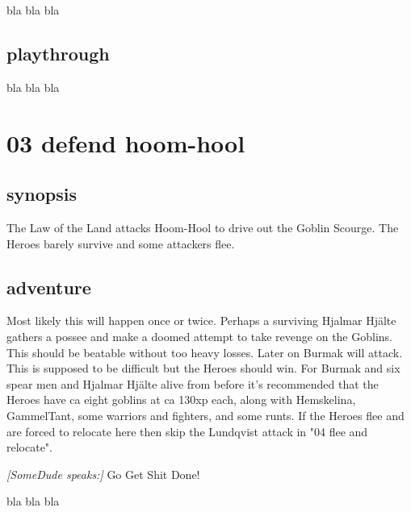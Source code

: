 bla bla bla


\subsection*{playthrough}

bla bla bla







\newpage
\section*{03 defend hoom-hool}



\subsection*{synopsis}

The Law of the Land attacks Hoom-Hool to drive out the Goblin Scourge. The Heroes barely survive and some attackers flee.


\subsection*{adventure}

Most likely this will happen once or twice. Perhaps a surviving Hjalmar Hjälte gathers a possee and make a doomed attempt to take revenge on the Goblins. This should be beatable without too heavy losses.
Later on Burmak will attack. This is supposed to be difficult but the Heroes should win.
For Burmak and six spear men and Hjalmar Hjälte alive from before it's recommended that the Heroes have ca eight goblins at ca 130xp each, along with Hemskelina, GammelTant, some warriors and fighters, and some runts.
If the Heroes flee and are forced to relocate here then skip the Lundqvist attack in "04 flee and relocate".

\begin{readoutloud}
\emph{[SomeDude speaks:]}
Go Get Shit Done!
\end{readoutloud}

\noindent bla bla bla


